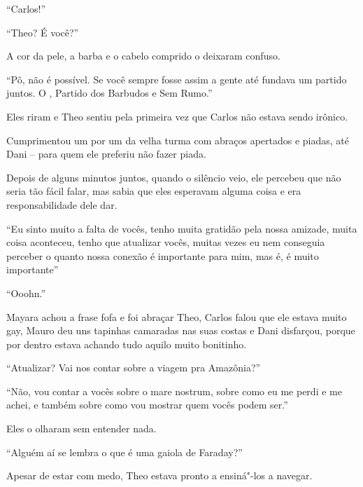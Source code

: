 ``Carlos!''

``Theo? É você?''

A cor da pele, a barba e o cabelo comprido o deixaram confuso.

``Pô, não é possível. Se você sempre fosse assim a gente até fundava um
partido juntos. O , Partido dos Barbudos e Sem Rumo.''

Eles riram e Theo sentiu pela primeira vez que Carlos não estava sendo
irônico.

Cumprimentou um por um da velha turma com abraços apertados e piadas,
até Dani -- para quem ele preferiu não fazer piada.

Depois de alguns minutos juntos, quando o silêncio veio, ele percebeu
que não seria tão fácil falar, mas sabia que eles esperavam alguma coisa
e era responsabilidade dele dar.

``Eu sinto muito a falta de vocês, tenho muita gratidão pela nossa
amizade, muita coisa aconteceu, tenho que atualizar vocês, muitas vezes
eu nem conseguia perceber o quanto nossa conexão é importante para mim,
mas é, é muito importante''

``Ooohn.''

Mayara achou a frase fofa e foi abraçar Theo, Carlos falou que ele
estava muito gay, Mauro deu uns tapinhas camaradas nas suas costas e
Dani disfarçou, porque por dentro estava achando tudo aquilo muito
bonitinho.

``Atualizar? Vai nos contar sobre a viagem pra Amazônia?''

``Não, vou contar a vocês sobre o mare nostrum, sobre como eu me perdi e
me achei, e também sobre como vou mostrar quem vocês podem ser.''

Eles o olharam sem entender nada.

``Alguém aí se lembra o que é uma gaiola de Faraday?''

Apesar de estar com medo, Theo estava pronto a ensiná"-los a navegar.
